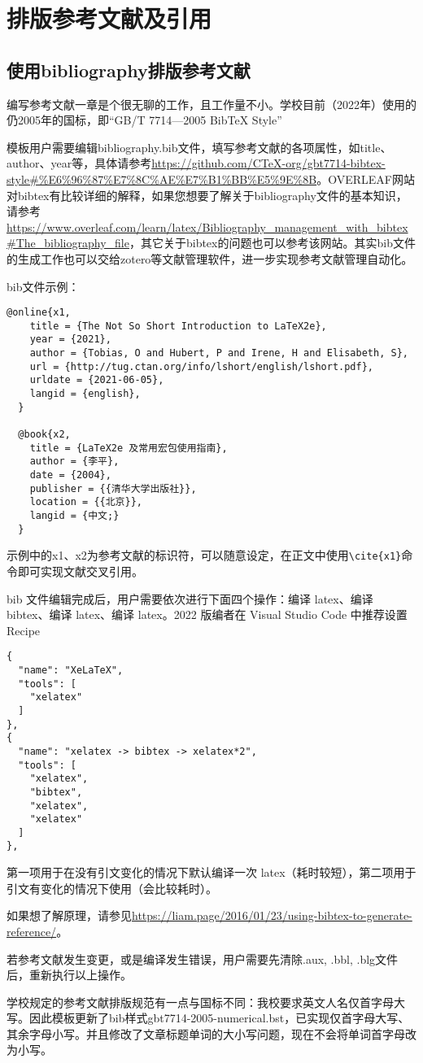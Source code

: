 \section{排版参考文献及引用}\label{sec:ref}

\subsection{使用bibliography排版参考文献}

编写参考文献一章是个很无聊的工作，且工作量不小。学校目前（2022年）使用的仍2005年的国标，即“GB/T 7714—2005 BibTeX Style”

模板用户需要编辑bibliography.bib文件，填写参考文献的各项属性，如title、author、year等，具体请参考\url{https://github.com/CTeX-org/gbt7714-bibtex-style#%E6%96%87%E7%8C%AE%E7%B1%BB%E5%9E%8B}。OVERLEAF网站对bibtex有比较详细的解释，如果您想要了解关于bibliography文件的基本知识，请参考\url{https://www.overleaf.com/learn/latex/Bibliography_management_with_bibtex#The_bibliography_file}，其它关于bibtex的问题也可以参考该网站。其实bib文件的生成工作也可以交给zotero等文献管理软件，进一步实现参考文献管理自动化。

bib文件示例：
{
\color{green!50!black}
\begin{lstlisting}[breaklines=true,]
  @online{x1,
    title = {The Not So Short Introduction to LaTeX2e},
    year = {2021},
    author = {Tobias, O and Hubert, P and Irene, H and Elisabeth, S},
    url = {http://tug.ctan.org/info/lshort/english/lshort.pdf},
    urldate = {2021-06-05},
    langid = {english},
  }
  
  @book{x2,
    title = {LaTeX2e 及常用宏包使用指南},
    author = {李平},
    date = {2004},
    publisher = {{清华大学出版社}},
    location = {{北京}},
    langid = {中文;}
  }
\end{lstlisting}
}

示例中的x1、x2为参考文献的标识符，可以随意设定，在正文中使用\verb|\cite{x1}|命令即可实现文献交叉引用。

bib 文件编辑完成后，用户需要依次进行下面四个操作：编译 latex、编译 bibtex、编译 latex、编译 latex。2022 版编者在 Visual Studio Code 中推荐设置 Recipe

{
\color{green!50!black}
\begin{lstlisting}[breaklines=true,]
{
  "name": "XeLaTeX",
  "tools": [
    "xelatex"
  ]
},
{
  "name": "xelatex -> bibtex -> xelatex*2",
  "tools": [
    "xelatex",
    "bibtex",
    "xelatex",
    "xelatex"
  ]
},
\end{lstlisting}
}

第一项用于在没有引文变化的情况下默认编译一次 latex（耗时较短），第二项用于引文有变化的情况下使用（会比较耗时）。

如果想了解原理，请参见\url{https://liam.page/2016/01/23/using-bibtex-to-generate-reference/}。

若参考文献发生变更，或是编译发生错误，用户需要先清除.aux, .bbl, .blg文件后，重新执行以上操作。

学校规定的参考文献排版规范有一点与国标不同：我校要求英文人名仅首字母大写。因此模板更新了bib样式gbt7714-2005-numerical.bst，已实现仅首字母大写、其余字母小写。并且修改了文章标题单词的大小写问题，现在不会将单词首字母改为小写。